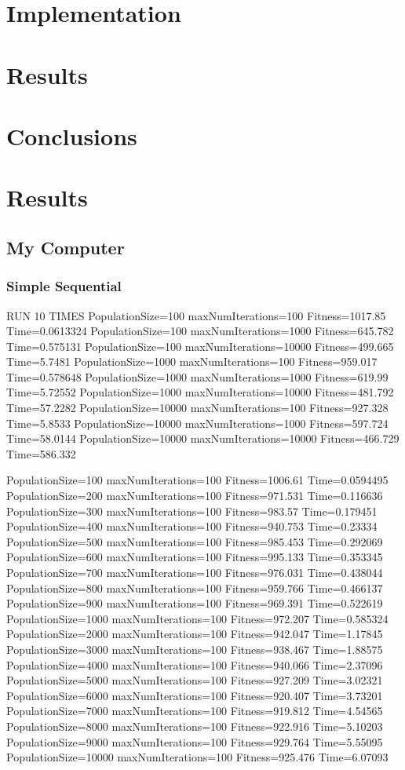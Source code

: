 \documentclass[10pt,letterpaper]{article}
\begin{document}
\section{Implementation}

\section{Results}

\section{Conclusions}




\section{Results}
\subsection{My Computer}
\subsubsection{Simple Sequential} 
RUN 10 TIMES 
PopulationSize=100 maxNumIterations=100 Fitness=1017.85 Time=0.0613324
PopulationSize=100 maxNumIterations=1000 Fitness=645.782 Time=0.575131
PopulationSize=100 maxNumIterations=10000 Fitness=499.665 Time=5.7481
PopulationSize=1000 maxNumIterations=100 Fitness=959.017 Time=0.578648
PopulationSize=1000 maxNumIterations=1000 Fitness=619.99 Time=5.72552
PopulationSize=1000 maxNumIterations=10000 Fitness=481.792 Time=57.2282
PopulationSize=10000 maxNumIterations=100 Fitness=927.328 Time=5.8533
PopulationSize=10000 maxNumIterations=1000 Fitness=597.724 Time=58.0144
PopulationSize=10000 maxNumIterations=10000 Fitness=466.729 Time=586.332


PopulationSize=100 maxNumIterations=100 Fitness=1006.61 Time=0.0594495
PopulationSize=200 maxNumIterations=100 Fitness=971.531 Time=0.116636
PopulationSize=300 maxNumIterations=100 Fitness=983.57 Time=0.179451
PopulationSize=400 maxNumIterations=100 Fitness=940.753 Time=0.23334
PopulationSize=500 maxNumIterations=100 Fitness=985.453 Time=0.292069
PopulationSize=600 maxNumIterations=100 Fitness=995.133 Time=0.353345
PopulationSize=700 maxNumIterations=100 Fitness=976.031 Time=0.438044
PopulationSize=800 maxNumIterations=100 Fitness=959.766 Time=0.466137
PopulationSize=900 maxNumIterations=100 Fitness=969.391 Time=0.522619
PopulationSize=1000 maxNumIterations=100 Fitness=972.207 Time=0.585324
PopulationSize=2000 maxNumIterations=100 Fitness=942.047 Time=1.17845
PopulationSize=3000 maxNumIterations=100 Fitness=938.467 Time=1.88575
PopulationSize=4000 maxNumIterations=100 Fitness=940.066 Time=2.37096
PopulationSize=5000 maxNumIterations=100 Fitness=927.209 Time=3.02321
PopulationSize=6000 maxNumIterations=100 Fitness=920.407 Time=3.73201
PopulationSize=7000 maxNumIterations=100 Fitness=919.812 Time=4.54565
PopulationSize=8000 maxNumIterations=100 Fitness=922.916 Time=5.10203
PopulationSize=9000 maxNumIterations=100 Fitness=929.764 Time=5.55095
PopulationSize=10000 maxNumIterations=100 Fitness=925.476 Time=6.07093
\end{document}
